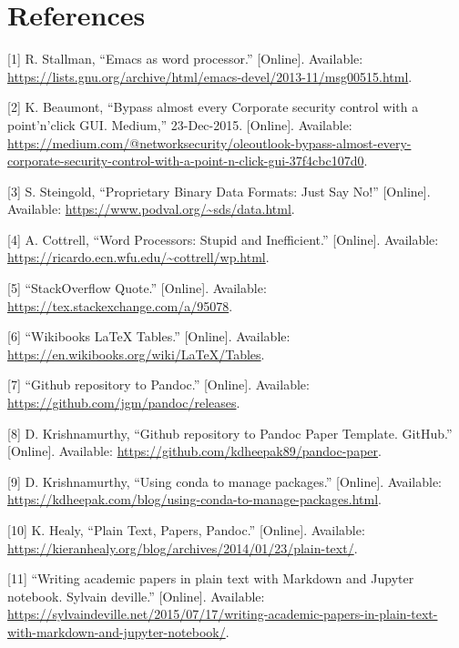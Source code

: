 \documentclass[journal,10pt,final]{IEEEtran}
\begin{document}
\section{References}\label{references}

\hypertarget{refs}{}
\hypertarget{ref-stallmanux5femacs}{}
{[}1{]} R. Stallman, ``Emacs as word processor.'' {[}Online{]}.
Available:
\url{https://lists.gnu.org/archive/html/emacs-devel/2013-11/msg00515.html}.

\hypertarget{ref-beaumontux5fbypassux5f2015}{}
{[}2{]} K. Beaumont, ``Bypass almost every Corporate security control
with a point'n'click GUI. Medium,'' 23-Dec-2015. {[}Online{]}.
Available:
\url{https://medium.com/@networksecurity/oleoutlook-bypass-almost-every-corporate-security-control-with-a-point-n-click-gui-37f4cbc107d0}.

\hypertarget{ref-steingoldux5fproprietary}{}
{[}3{]} S. Steingold, ``Proprietary Binary Data Formats: Just Say No!''
{[}Online{]}. Available: \url{https://www.podval.org/~sds/data.html}.

\hypertarget{ref-cottrellux5fword}{}
{[}4{]} A. Cottrell, ``Word Processors: Stupid and Inefficient.''
{[}Online{]}. Available:
\url{https://ricardo.ecn.wfu.edu/~cottrell/wp.html}.

\hypertarget{ref-ux5fstackoverflow}{}
{[}5{]} ``StackOverflow Quote.'' {[}Online{]}. Available:
\url{https://tex.stackexchange.com/a/95078}.

\hypertarget{ref-ux5fwikibooks}{}
{[}6{]} ``Wikibooks LaTeX Tables.'' {[}Online{]}. Available:
\url{https://en.wikibooks.org/wiki/LaTeX/Tables}.

\hypertarget{ref-ux5fgithub}{}
{[}7{]} ``Github repository to Pandoc.'' {[}Online{]}. Available:
\url{https://github.com/jgm/pandoc/releases}.

\hypertarget{ref-krishnamurthyux5fgithub}{}
{[}8{]} D. Krishnamurthy, ``Github repository to Pandoc Paper Template.
GitHub.'' {[}Online{]}. Available:
\url{https://github.com/kdheepak89/pandoc-paper}.

\hypertarget{ref-krishnamurthyux5fusing}{}
{[}9{]} D. Krishnamurthy, ``Using conda to manage packages.''
{[}Online{]}. Available:
\url{https://kdheepak.com/blog/using-conda-to-manage-packages.html}.

\hypertarget{ref-healyux5fplain}{}
{[}10{]} K. Healy, ``Plain Text, Papers, Pandoc.'' {[}Online{]}.
Available:
\url{https://kieranhealy.org/blog/archives/2014/01/23/plain-text/}.

\hypertarget{ref-ux5fwriting}{}
{[}11{]} ``Writing academic papers in plain text with Markdown and
Jupyter notebook. Sylvain deville.'' {[}Online{]}. Available:
\url{https://sylvaindeville.net/2015/07/17/writing-academic-papers-in-plain-text-with-markdown-and-jupyter-notebook/}.
\end{document}
